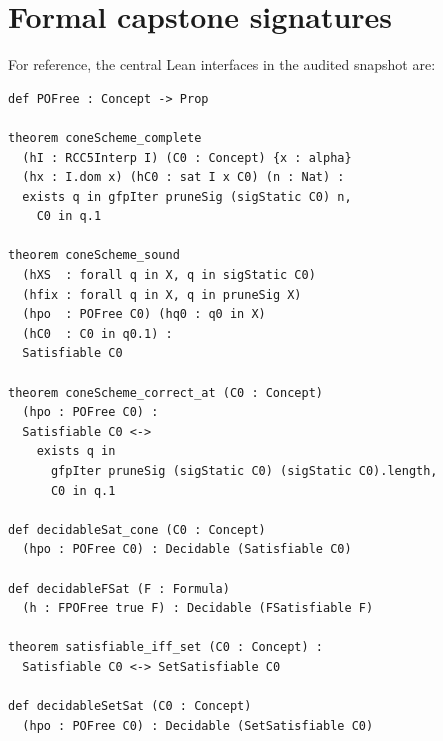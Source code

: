\documentclass[11pt]{article}
\theoremstyle{plain}
\theoremstyle{definition}
\theoremstyle{remark}
\begin{document}
\appendix

\section{Formal capstone signatures}
\label{app:signatures}

For reference, the central Lean interfaces in the audited snapshot are:

\begin{lstlisting}
def POFree : Concept -> Prop

theorem coneScheme_complete
  (hI : RCC5Interp I) (C0 : Concept) {x : alpha}
  (hx : I.dom x) (hC0 : sat I x C0) (n : Nat) :
  exists q in gfpIter pruneSig (sigStatic C0) n,
    C0 in q.1

theorem coneScheme_sound
  (hXS  : forall q in X, q in sigStatic C0)
  (hfix : forall q in X, q in pruneSig X)
  (hpo  : POFree C0) (hq0 : q0 in X)
  (hC0  : C0 in q0.1) :
  Satisfiable C0

theorem coneScheme_correct_at (C0 : Concept)
  (hpo : POFree C0) :
  Satisfiable C0 <->
    exists q in
      gfpIter pruneSig (sigStatic C0) (sigStatic C0).length,
      C0 in q.1

def decidableSat_cone (C0 : Concept)
  (hpo : POFree C0) : Decidable (Satisfiable C0)

def decidableFSat (F : Formula)
  (h : FPOFree true F) : Decidable (FSatisfiable F)

theorem satisfiable_iff_set (C0 : Concept) :
  Satisfiable C0 <-> SetSatisfiable C0

def decidableSetSat (C0 : Concept)
  (hpo : POFree C0) : Decidable (SetSatisfiable C0)
\end{lstlisting}
\end{document}
